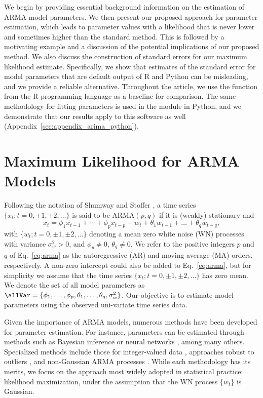 We begin by providing essential background information on the estimation of ARMA model parameters.
We then present our proposed approach for parameter estimation, which leads to parameter values with a likelihood that is never lower and sometimes higher than the standard method.
This is followed by a motivating example and a discussion of the potential implications of our proposed method.
We also discuss the construction of standard errors for our maximum likelihood estimate.
Specifically, we show that estimates of the standard error for model parameters that are default output of R and Python can be misleading, and we provide a reliable alternative.
Throughout the article, we use the  function from the R programming language as a baseline for comparison.
The same methodology for fitting parameters is used in the  module in Python, and we demonstrate that our results apply to this software as well (Appendix~\ref{sec:appendix_arima_python}).

\section{Maximum Likelihood for ARMA Models}

Following the notation of Shumway and Stoffer \cite{shumway2017}, a time series $\{x_t; t = 0, \pm1, \pm2, \ldots\}$ is said to be $\text{ARMA}(p, q)$ if it is (weakly) stationary and
\begin{equation}
  x_t = \phi_1x_{t - 1} + \cdots + \phi_px_{t - p} + w_t + \theta_1w_{t-1} + \ldots + \theta_qw_{t - q}, \label{eq:arma}
\end{equation}
with $\{w_t; t = 0, \pm1, \pm2, \ldots\}$ denoting a mean zero white noise (WN) processes with variance $\sigma_w^2 > 0$, and $\phi_p \neq 0$, $\theta_q \neq 0$.
We refer to the positive integers $p$ and $q$ of Eq.~\ref{eq:arma} as the autoregressive (AR) and moving average (MA) orders, respectively.
A non-zero intercept could also be added to Eq.~\ref{eq:arma}, but for simplicity we assume that the time series $\{x_t; t = 0, \pm1, \pm2, \ldots\}$ has zero mean.
We denote the set of all model parameters as $\allVar = \{\phi_1, \ldots, \phi_p, \theta_1, \ldots, \theta_q, \sigma_w^2\}$.
Our objective is to estimate model parameters using the observed uni-variate time series data.

Given the importance of ARMA models, numerous methods have been developed for parameter estimation.
For instance, parameters can be estimated through methods such as Bayesian inference \cite{monahan83,chib94} or neural networks \cite{chon97}, among many others.
Specialized methods include those for integer-valued data \cite{weiss24}, approaches robust to outliers \cite{chakhchoukh10}, and non-Gaussian ARMA processes \cite{lii90}.
While each methodology has its merits, we focus on the approach most widely adopted in statistical practice: likelihood maximization, under the assumption that the WN process $\{w_t\}$ is Gaussian.

